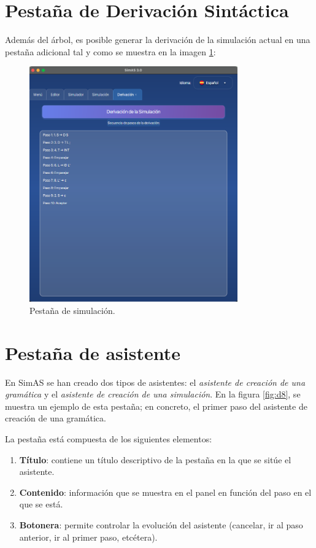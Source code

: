  \section{Pestaña de Derivación Sintáctica}

Además del árbol, es posible generar la derivación de la simulación actual en una pestaña adicional tal y como se muestra en la imagen \ref{fig:da24}:

\begin{figure}[htp]
\centering
	\includegraphics[width=0.8\textwidth]{figuras2/simulador/simulacion_derivacion.png}
	\caption{Pestaña de simulación.}
	\label{fig:da24}
\end{figure}

\section{Pestaña de asistente} \label{sec:pestaña_asistente}

En SimAS se han creado dos tipos de asistentes: el \textit{asistente de creación de una gramática} y el \textit{asistente de creación de una simulación}. En la figura \ref{fig:d8}, se muestra un ejemplo de esta pestaña; en concreto, el primer paso del asistente de creación de una gramática.

La pestaña está compuesta de los siguientes elementos:
\begin{enumerate}
 \item \textbf{Título}: contiene un título descriptivo de la pestaña en la que se sitúe el asistente.
 \item \textbf{Contenido}: información que se muestra en el panel en función del paso en el que se está.
 \item \textbf{Botonera}: permite controlar la evolución del asistente (cancelar, ir al paso anterior, ir al primer paso, etcétera).
\end{enumerate}

